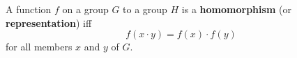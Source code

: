 A function $f$ on a group $G$ to a group $H$ is a \textbf{homomorphism} (or \textbf{representation}) iff
$$f(x \cdot y) = f(x) \cdot f(y)$$
for all members $x$ and $y$ of $G$.
